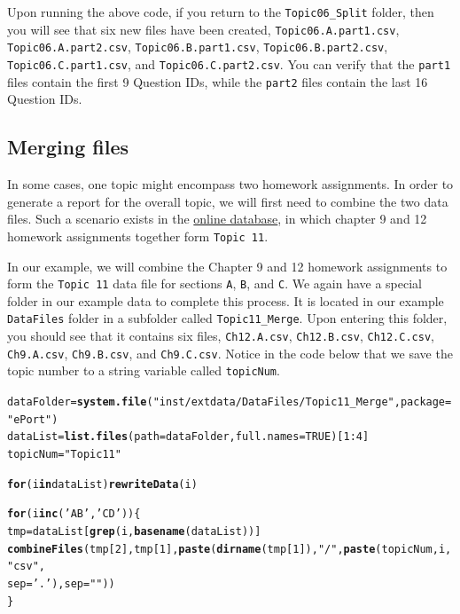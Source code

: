 \documentclass{article}\usepackage[]{graphicx}\usepackage[]{color}
\makeatletter
\newcommand{\hlnum}[1]{\textcolor[rgb]{0.686,0.059,0.569}{#1}}%
\newcommand{\hlstr}[1]{\textcolor[rgb]{0.192,0.494,0.8}{#1}}%
\newcommand{\hlopt}[1]{\textcolor[rgb]{0,0,0}{#1}}%
\newcommand{\hlstd}[1]{\textcolor[rgb]{0.345,0.345,0.345}{#1}}%
\newcommand{\hlkwa}[1]{\textcolor[rgb]{0.161,0.373,0.58}{\textbf{#1}}}%
\newcommand{\hlkwb}[1]{\textcolor[rgb]{0.69,0.353,0.396}{#1}}%
\newcommand{\hlkwc}[1]{\textcolor[rgb]{0.333,0.667,0.333}{#1}}%
\newcommand{\hlkwd}[1]{\textcolor[rgb]{0.737,0.353,0.396}{\textbf{#1}}}%
\newenvironment{kframe}{%
 \def\at@end@of@kframe{}%
 \ifinner\ifhmode%
  \def\at@end@of@kframe{\end{minipage}}%
  \begin{minipage}{\columnwidth}%
 \fi\fi%
 \def\FrameCommand##1{\hskip\@totalleftmargin \hskip-\fboxsep
 \colorbox{shadecolor}{##1}\hskip-\fboxsep
     \hskip-\linewidth \hskip-\@totalleftmargin \hskip\columnwidth}%
 \MakeFramed {\advance\hsize-\width
   \@totalleftmargin\z@ \linewidth\hsize
   \@setminipage}}%
 {\par\unskip\endMakeFramed%
 \at@end@of@kframe}
\newenvironment{knitrout}{}{} %
\numberwithin{equation}{section} %
\makeatother
\begin{document}
Upon running the above code, if you return to the \texttt{Topic06\_Split} folder, then you will see that six new files have been created, \texttt{Topic06.A.part1.csv}, \texttt{Topic06.A.part2.csv}, \texttt{Topic06.B.part1.csv}, \texttt{Topic06.B.part2.csv}, \texttt{Topic06.C.part1.csv}, and \texttt{Topic06.C.part2.csv}. You can verify that the \texttt{part1} files contain the first 9 Question IDs, while the \texttt{part2} files contain the last 16 Question IDs.

\subsection{Merging files}

In some cases, one topic might encompass two homework assignments. In order to generate a report for the overall topic, we will first need to combine the two data files. Such a scenario exists in the \hyperref[sec:OnlineHomework]{online database}, in which chapter 9 and 12 homework assignments together form \texttt{Topic 11}.

In our example, we will combine the Chapter 9 and 12 homework assignments to form the \texttt{Topic 11} data file for sections \texttt{A}, \texttt{B}, and \texttt{C}. We again have a special folder in our example data to complete this process. It is located in our example \texttt{DataFiles} folder in a subfolder called \texttt{Topic11\_Merge}. Upon entering this folder, you should see that it contains six files, \texttt{Ch12.A.csv}, \texttt{Ch12.B.csv}, \texttt{Ch12.C.csv}, \texttt{Ch9.A.csv}, \texttt{Ch9.B.csv}, and \texttt{Ch9.C.csv}. Notice in the code below that we save the topic number to a string variable called \texttt{topicNum}. \\

\begin{knitrout}
\color{fgcolor}\begin{kframe}
\begin{alltt}
\hlstd{dataFolder} \hlkwb{=} \hlkwd{system.file}\hlstd{(}\hlstr{"inst/extdata/DataFiles/Topic11_Merge"}\hlstd{,} \hlkwc{package}\hlstd{=}\hlstr{"ePort"}\hlstd{)}
\hlstd{dataList} \hlkwb{=} \hlkwd{list.files}\hlstd{(}\hlkwc{path} \hlstd{= dataFolder,} \hlkwc{full.names}\hlstd{=}\hlnum{TRUE}\hlstd{)[}\hlnum{1}\hlopt{:}\hlnum{4}\hlstd{]}
\hlstd{topicNum} \hlkwb{=} \hlstr{"Topic11"}

\hlkwa{for} \hlstd{(i} \hlkwa{in} \hlstd{dataList)} \hlkwd{rewriteData}\hlstd{(i)}

\hlkwa{for}\hlstd{(i} \hlkwa{in} \hlkwd{c}\hlstd{(}\hlstr{'AB'}\hlstd{,} \hlstr{'CD'}\hlstd{))\{}
  \hlstd{tmp} \hlkwb{=} \hlstd{dataList[}\hlkwd{grep}\hlstd{(i,} \hlkwd{basename}\hlstd{(dataList))]}
  \hlkwd{combineFiles}\hlstd{(tmp[}\hlnum{2}\hlstd{], tmp[}\hlnum{1}\hlstd{],} \hlkwd{paste}\hlstd{(}\hlkwd{dirname}\hlstd{(tmp[}\hlnum{1}\hlstd{]),} \hlstr{"/"}\hlstd{,} \hlkwd{paste}\hlstd{(topicNum, i,} \hlstr{"csv"}\hlstd{,}
    \hlkwc{sep} \hlstd{=} \hlstr{'.'}\hlstd{),} \hlkwc{sep} \hlstd{=} \hlstr{""}\hlstd{))}
\hlstd{\}}
\end{alltt}
\end{kframe}
\end{knitrout}
\end{document}
